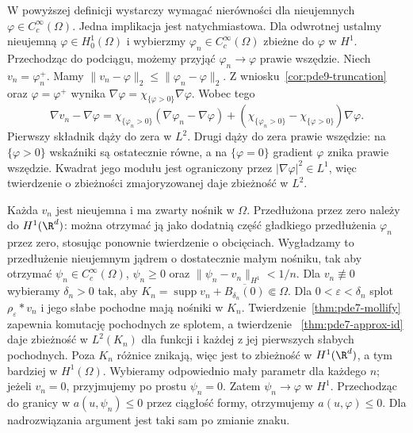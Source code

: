 \begin{uwaga}
W powyższej definicji wystarczy wymagać nierówności
dla nieujemnych $\varphi\in C_c^\infty(\Omega)$.
Jedna implikacja jest natychmiastowa. Dla odwrotnej
ustalmy nieujemną $\varphi\in H_0^1(\Omega)$ i wybierzmy
$\varphi_n\in C_c^\infty(\Omega)$ zbieżne do $\varphi$
w $H^1$. Przechodząc do podciągu, możemy przyjąć
$\varphi_n\to\varphi$ prawie wszędzie.
Niech $v_n=\varphi_n^+$. Mamy
$\|v_n-\varphi\|_2\le\|\varphi_n-\varphi\|_2$.
Z wniosku~\ref{cor:pde9-truncation} oraz $\varphi=\varphi^+$
wynika $\nabla\varphi=\chi_{\{\varphi>0\}}\nabla\varphi$.
Wobec tego
\[
 \nabla v_n-\nabla\varphi
 =\chi_{\{\varphi_n>0\}}(\nabla\varphi_n-\nabla\varphi)
 +(\chi_{\{\varphi_n>0\}}-\chi_{\{\varphi>0\}})\nabla\varphi .
\]
Pierwszy składnik dąży do zera w $L^2$.
Drugi dąży do zera prawie wszędzie: na $\{\varphi>0\}$
wskaźniki są ostatecznie równe, a na $\{\varphi=0\}$
gradient $\varphi$ znika prawie wszędzie.
Kwadrat jego modułu jest ograniczony przez
$|\nabla\varphi|^2\in L^1$, więc twierdzenie o zbieżności
zmajoryzowanej daje zbieżność w $L^2$.

Każda $v_n$ jest nieujemna i ma zwarty nośnik w $\Omega$.
Przedłużona przez zero należy do $H^1(\R^d)$: można
otrzymać ją jako dodatnią część gładkiego przedłużenia
$\varphi_n$ przez zero, stosując ponownie twierdzenie
o obcięciach. Wygładzamy to przedłużenie nieujemnym jądrem
o dostatecznie małym nośniku, tak aby otrzymać
$\psi_n\in C_c^\infty(\Omega)$, $\psi_n\ge0$ oraz
$\|\psi_n-v_n\|_{H^1}<1/n$.
Dla $v_n\not\equiv0$ wybieramy $\delta_n>0$ tak, aby
$K_n=\operatorname{supp}v_n+\overline{B_{\delta_n}(0)}
\Subset\Omega$. Dla $0<\varepsilon<\delta_n$ splot
$\rho_\varepsilon*v_n$ i jego słabe pochodne mają
nośniki w $K_n$. Twierdzenie~\ref{thm:pde7-mollify}
zapewnia komutację pochodnych ze splotem, a twierdzenie
~\ref{thm:pde7-approx-id} daje zbieżność w $L^2(K_n)$
dla funkcji i każdej z jej pierwszych słabych pochodnych.
Poza $K_n$ różnice znikają, więc jest to zbieżność
w $H^1(\R^d)$, a tym bardziej w $H^1(\Omega)$.
Wybieramy odpowiednio mały parametr dla każdego $n$;
jeżeli $v_n=0$, przyjmujemy po prostu $\psi_n=0$.
Zatem $\psi_n\to\varphi$ w $H^1$.
Przechodząc do granicy w $a(u,\psi_n)\le0$ przez ciągłość
formy, otrzymujemy $a(u,\varphi)\le0$.
Dla nadrozwiązania argument jest taki sam po zmianie znaku.
\end{uwaga}

